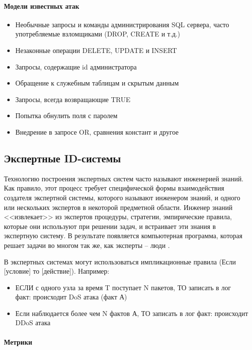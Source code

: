 \paragraph{Модели известных атак}
\begin{itemize}
	\item Необычные запросы и команды администрирования SQL сервера, часто употребляемые взломщиками (DROP, CREATE и т.д.)
	\item Незаконные операции DELETE, UPDATE и INSERT
	\item Запросы, содержащие id администратора
	\item Обращение к служебным таблицам и скрытым данным
	\item Запросы, всегда возвращающие TRUE
	\item Попытка обнулить поля с паролем
	\item Внедрение в запросе OR, сравнения констант и другое
\end{itemize}

\subsection{Экспертные ID-системы}

Технологию построения экспертных систем часто называют инженерией знаний. Как правило, этот процесс требует специфической формы взаимодействия создателя экспертной системы, которого называют инженером знаний, и одного или нескольких экспертов в некоторой предметной области.  Инженер знаний <<извлекает>> из экспертов процедуры, стратегии,  эмпирические правила, которые они используют при решении задач, и  встраивает эти знания в экспертную систему. В результате появляется   компьютерная программа, которая решает задачи во многом так же, как   эксперты -- люди \autocite{ExpertSystems}.

В экспертных системах могут использоваться импликационные правила (Если [условие] то [действие]). Например:
\begin{itemize}
	\item ЕСЛИ с одного узла за время T поступает N пакетов, ТО записать в лог факт: происходит DoS атака (факт А)
	\item Если наблюдается более чем N фактов А, ТО записать в лог факт: происходит DDoS атака
\end{itemize}

\paragraph{Метрики}

